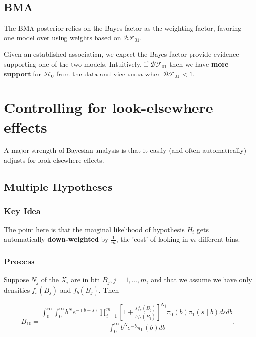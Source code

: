 \documentclass[11pt]{article}
\begin{document}
\subsection{BMA}

The BMA posterior relies on the Bayes factor as the weighting factor, favoring one model over using weights based on $\mathcal{B}\mathcal{F}_{01}$. 

Given an established association, we expect the Bayes factor provide evidence supporting one of the two models. Intuitively, if $\mathcal{B}\mathcal{F}_{01}$ then we have \textbf{more support} for $\mathcal{H}_0$ from the data and vice versa when $\mathcal{B}\mathcal{F}_{01}<1$. \cite{10.1093/biostatistics/kxy049} 

\section{Controlling for look-elsewhere effects}

A major strength of Bayesian analysis is that it easily (and often automatically) adjusts for look-elsewhere effects.

\subsection{Multiple Hypotheses}

\subsubsection{Key Idea}

The point here is that the marginal likelihood of hypothesis $H_{i}$ gets automatically \textbf{down-weighted} by $\frac{1}{m}$, the 'cost' of looking in $m$ different bins. \cite{Berger:2011fuz}

\subsubsection{Process}

Suppose $N_{j}$ of the $X_{i}$ are in bin $B_{j}, j=1, \ldots, m$, and that we assume we have only densities $f_{s}\left(B_{j}\right)$ and $f_{b}\left(B_{j}\right)$. Then

\begin{equation}
    B_{10}=\frac{\int_{0}^{\infty} \int_{0}^{\infty} b^{N} e^{-(b+s)} \prod_{i=1}^{m}\left[1+\frac{s f_{s}\left(B_{j}\right)}{b f_{b}\left(B_{j}\right)}\right]^{N_{j}} \pi_{0}(b) \pi_{1}(s \mid b) d s d b}{\int_{0}^{\infty} b^{N} e^{-b} \pi_{0}(b) d b} .
\end{equation}
\end{document}
